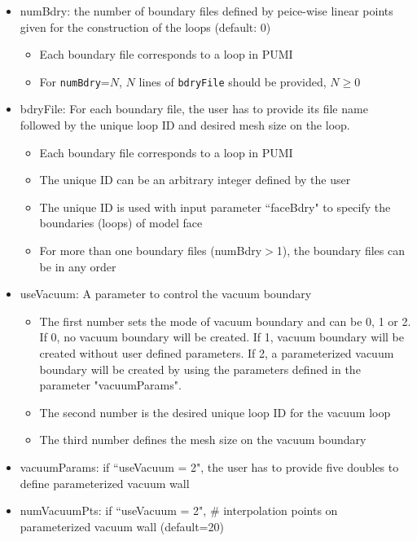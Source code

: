 \begin{itemize}
\item numBdry: the number of boundary files defined by peice-wise linear points given for the construction of the loops (default: 0)
  \begin{itemize}
  \item Each boundary file corresponds to a loop in PUMI
  \item For \texttt{numBdry}=$N$, $N$ lines of \texttt{bdryFile} should be provided, $N \ge 0$
  \end{itemize}
\item bdryFile: For each boundary file, the user has to provide its file name followed by the unique loop ID and desired mesh size on the loop.
  \begin{itemize}
  \item Each boundary file corresponds to a loop in PUMI
  \item The unique ID can be an arbitrary integer defined by the user
  \item The unique ID is used with input parameter ``faceBdry" to specify the boundaries (loops) of model face
  \item For more than one boundary files (numBdry$>$1), the boundary files can be in any order
  \end{itemize}

\item useVacuum: A parameter to control the vacuum boundary
  \begin{itemize}
  \item The first number sets the mode of vacuum boundary and can be 0, 1 or 2. If 0, no vacuum boundary will be created. If 1, vacuum boundary will be created without user defined parameters. If 2, a parameterized vacuum boundary will be created by using the parameters defined in the parameter "vacuumParams".
  \item The second number is the desired unique loop ID for the vacuum loop
  \item  The third number defines the mesh size on the vacuum boundary
  \end{itemize}
\item vacuumParams: if ``useVacuum = 2", the user has to provide five doubles to define parameterized vacuum wall
\item numVacuumPts: if ``useVacuum = 2", \# interpolation points on parameterized vacuum wall (default=20)


\end{itemize}
